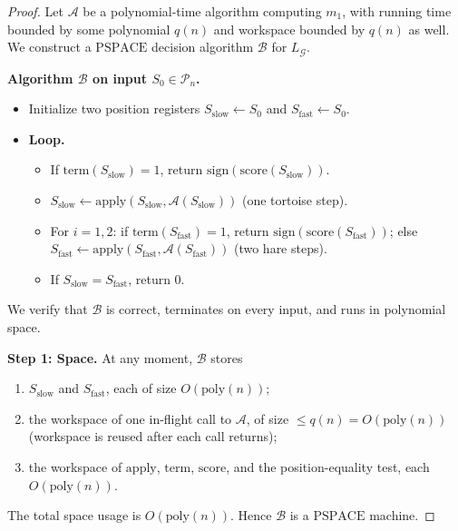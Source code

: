 \documentclass[11pt,a4paper]{amsart}
\theoremstyle{plain}
\theoremstyle{definition}
\theoremstyle{remark}
\newcommand{\PSPACE}{\mathrm{PSPACE}}
\newcommand{\Apply}{\mathrm{apply}}
\newcommand{\score}{\mathrm{score}}
\newcommand{\poly}{\mathrm{poly}}
\begin{document}
\begin{proof}
Let $\mathcal{A}$ be a polynomial-time algorithm computing $m_1$, with
running time bounded by some polynomial $q(n)$ and workspace bounded by
$q(n)$ as well. We construct a $\PSPACE$ decision algorithm $\mathcal{B}$
for $L_\mathcal{G}$.

\medskip
\noindent\textbf{Algorithm $\mathcal{B}$ on input $S_0 \in \mathcal{P}_n$.}

\begin{itemize}[nosep]
\item Initialize two position registers
  $S_{\mathrm{slow}} \leftarrow S_0$ and
  $S_{\mathrm{fast}} \leftarrow S_0$.
\item \textbf{Loop.}
  \begin{itemize}[nosep]
    \item If $\mathrm{term}(S_{\mathrm{slow}}) = 1$, return
      $\mathrm{sign}(\score(S_{\mathrm{slow}}))$.
    \item $S_{\mathrm{slow}} \leftarrow
      \Apply(S_{\mathrm{slow}}, \mathcal{A}(S_{\mathrm{slow}}))$
      \quad (one tortoise step).
    \item For $i = 1, 2$: \quad if
      $\mathrm{term}(S_{\mathrm{fast}}) = 1$, return
      $\mathrm{sign}(\score(S_{\mathrm{fast}}))$;
      else $S_{\mathrm{fast}} \leftarrow
      \Apply(S_{\mathrm{fast}}, \mathcal{A}(S_{\mathrm{fast}}))$
      \quad (two hare steps).
    \item If $S_{\mathrm{slow}} = S_{\mathrm{fast}}$, return $0$.
  \end{itemize}
\end{itemize}

We verify that $\mathcal{B}$ is correct, terminates on every input, and
runs in polynomial space.

\medskip
\noindent\textbf{Step 1: Space.}
At any moment, $\mathcal{B}$ stores
\begin{enumerate}[label=(\alph*),nosep]
  \item $S_{\mathrm{slow}}$ and $S_{\mathrm{fast}}$, each of size
        $O(\poly(n))$;
  \item the workspace of one in-flight call to $\mathcal{A}$,
        of size $\leq q(n) = O(\poly(n))$ (workspace is reused after
        each call returns);
  \item the workspace of $\Apply$, $\mathrm{term}$, $\score$,
        and the position-equality test, each $O(\poly(n))$.
\end{enumerate}
The total space usage is $O(\poly(n))$. Hence $\mathcal{B}$ is a
$\PSPACE$ machine.


\end{proof}
\end{document}
